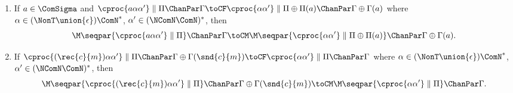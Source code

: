 \begin{lemma}\label{apx:lemma:leftmost_term_simulation}
\begin{enumerate}
	\item If ${a \in \ComSigma}$ and
			  $\cproc{a\alpha\alpha'} \parallel \Pi \ChanPar \Gamma \toCF 
			   \cproc{\alpha\alpha'}  \parallel \Pi \oplus \Pi(a) \ChanPar \Gamma \oplus \Gamma(a)$
			where 
				  $\alpha \in {(\NonT \union \{\epsilon\})\ComN^*}$, 
				  $\alpha' \in (\NComN \ComN)^*$, 
			then 
			$$\M\seqpar{\cproc{a\alpha\alpha'} \parallel \Pi} \ChanPar \Gamma \toCM 
			  \M\seqpar{\cproc{\alpha\alpha'}  \parallel \Pi \oplus \Pi(a)} \ChanPar \Gamma \oplus \Gamma(a).$$
	\item If $\cproc{(\rec{c}{m})\alpha\alpha'} \parallel \Pi \ChanPar \Gamma \oplus \Gamma(\snd{c}{m}) 
			  \toCF 
			  \cproc{\alpha\alpha'}           \parallel \Pi \ChanPar \Gamma $
			where 
				  $\alpha \in {(\NonT \union \{\epsilon\})\ComN^*}$, 
				  $\alpha' \in (\NComN \ComN)^*$, 
			then 
			$$\M\seqpar{\cproc{(\rec{c}{m})\alpha\alpha'} \parallel \Pi} \ChanPar \Gamma \oplus \Gamma(\snd{c}{m})\toCM 
			  \M\seqpar{\cproc{\alpha\alpha'}             \parallel \Pi} \ChanPar \Gamma.$$
\end{enumerate}
\end{lemma}
